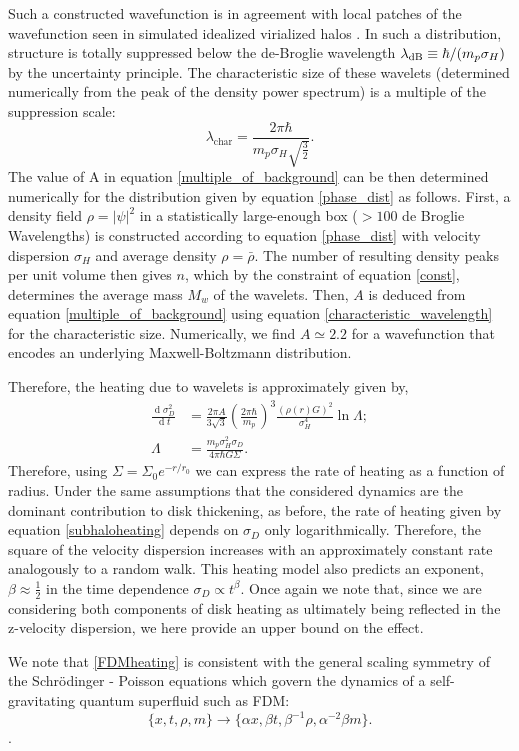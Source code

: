 \documentclass[usenatbib]{mnras}
\renewcommand{\d}[1]{\! \mathrm{d}#1 \:}
\newcommand{\deriv}[2]{\frac{\d{#1}}{\d{#2}}}
\renewcommand{\d}[1]{\ensuremath{\operatorname{d}\!{#1}}}
\begin{document}
Such a constructed wavefunction is in agreement with local patches of the wavefunction seen in simulated idealized virialized halos \citep{BECDM}.
In such a distribution, structure is totally suppressed below the de-Broglie wavelength $\lambda_{\rm dB} \equiv \hbar/(m_p\sigma_H)$ by the uncertainty principle.
The characteristic size of these wavelets (determined numerically from the peak of the density power spectrum) is a multiple of the suppression scale:
\begin{equation} \label{characteristic_wavelength}
\lambda_{\text{char}} = \frac{ 2 \pi \hbar}{m_p \sigma_H \sqrt{\frac{3}{2}}}.
\end{equation}
The value of A in equation \eqref{multiple_of_background} can be then determined numerically for the distribution given by equation \eqref{phase_dist} as follows. First, a density field $\rho = |\psi|^2$ in a statistically large-enough box ($> 100$ de Broglie Wavelengths) is constructed according to equation \eqref{phase_dist} with velocity dispersion $\sigma_H$ and average density $\rho = \bar{\rho}$. The number of resulting density peaks per unit volume then gives $n$, which by the constraint of equation \eqref{const}, determines the average mass $M_w$ of the wavelets. Then, $A$ is deduced from equation \eqref{multiple_of_background} using equation \eqref{characteristic_wavelength} for the characteristic size. Numerically, we find $A\simeq 2.2$ for a wavefunction that encodes an underlying Maxwell-Boltzmann distribution.
\par
Therefore, the heating due to wavelets is approximately given by,
\begin{subequations} \label{FDMheating}
\begin{align}
\deriv{\sigma_D^2}{t} & = \frac{2 \pi A}{3 \sqrt{3}} \left( \frac{2 \pi \hbar }{m_p} \right)^3 \frac{(\rho(r) G)^2}{\sigma_H^4} \ln{\Lambda} ;
\\
\Lambda & = \frac{m_p\sigma_H^2 \sigma_D}{4 \pi \hbar G \Sigma} .
\end{align}
\end{subequations}
Therefore, using $\Sigma = \Sigma_0 e^{-r/r_0}$ we can express the rate of heating as a function of radius. Under the same assumptions that the considered dynamics are the dominant contribution to disk thickening, as before, the rate of heating given by equation \eqref{subhaloheating} depends on $\sigma_D$ only logarithmically. Therefore, the square of the velocity dispersion increases with an approximately constant rate analogously to a random walk. This heating model also predicts an exponent, $\beta \approx \tfrac{1}{2}$ in the time dependence $\sigma_D \propto t^{\beta}$. Once again we note that, since we are considering both components of disk heating as ultimately being reflected in the z-velocity dispersion, we here provide an upper bound on the effect. 
\par
We note that \eqref{FDMheating} is consistent with the general scaling symmetry of the Schr\"{o}dinger - Poisson equations which govern the dynamics of a self-gravitating quantum superfluid such as FDM:
\begin{equation}
\{ x, t , \rho, m \} \to \{\alpha x, \beta t, \beta^{-1} \rho, \alpha^{-2} \beta m \} .
\end{equation}
\noindent \citep{Schrodinger-Poisson}.
\end{document}
